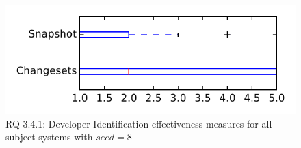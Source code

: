 
\begin{figure}
\centering
\includegraphics[height=0.4\textheight]{figures/dit_seed/rq1_tiny_8}
\caption{RQ 3.4.1: Developer Identification effectiveness measures for all subject systems with $seed=8$}
\label{fig:dit_seed:rq1:tiny}
\end{figure}
